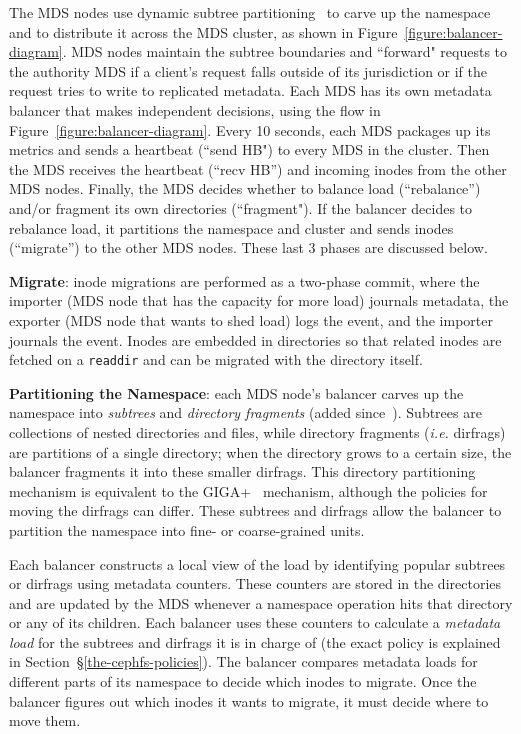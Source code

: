 The MDS nodes use dynamic subtree partitioning~\cite{weil:sc2004-dyn-metadata} to carve up the namespace and to distribute it across the MDS cluster, as shown in Figure~\ref{figure:balancer-diagram}. MDS nodes maintain the subtree boundaries and ``forward" requests to the authority MDS if a client's request falls outside of its jurisdiction or if the request tries to write to replicated metadata.  Each MDS has its own metadata balancer that makes independent decisions, using the flow in Figure~\ref{figure:balancer-diagram}.  Every 10 seconds, each MDS packages up its metrics and sends a heartbeat (``send HB") to every MDS in the cluster. Then the MDS receives the heartbeat (``recv HB'') and incoming inodes from the other MDS nodes. Finally, the MDS decides whether to balance load (``rebalance'') and/or fragment its own directories (``fragment"). If the balancer decides to rebalance load, it partitions the namespace and cluster and sends inodes (``migrate'') to the other MDS nodes. These last 3 phases are discussed below.

\textbf{Migrate}: inode migrations are performed as a two-phase commit, where the importer (MDS node that has the capacity for more load) journals metadata, the exporter (MDS node that wants to shed load) logs the event, and the importer journals the event. Inodes are embedded in directories so that related inodes are fetched on a \texttt{readdir} and can be migrated with the directory itself.

\textbf{Partitioning the Namespace}: each MDS node's balancer carves up the namespace into {\it subtrees} and {\it directory fragments} (added since~\cite{weil:sc2004-dyn-metadata,weil:osdi2006-ceph}). Subtrees are collections of nested directories and files, while directory fragments ({\it i.e.} dirfrags) are partitions of a single directory; when the directory grows to a certain size, the balancer fragments it into these smaller dirfrags. This directory partitioning mechanism is equivalent to the GIGA+~\cite{patil:fast2011-giga+} mechanism, although the policies for moving the dirfrags can differ.  These subtrees and dirfrags allow the balancer to  partition the namespace into fine- or coarse-grained units.

Each balancer constructs a local view of the load by identifying popular subtrees or dirfrags using metadata counters. These counters are stored in the directories and are updated by the MDS whenever a namespace operation hits that directory or any of its children. Each balancer uses these counters to calculate a {\it metadata load} for the subtrees and dirfrags it is in charge of (the exact policy is explained in Section~\S\ref{the-cephfs-policies}). The balancer compares metadata loads for different parts of its namespace to decide which inodes to migrate. Once the balancer figures out which inodes it wants to migrate, it must decide where to move them.

